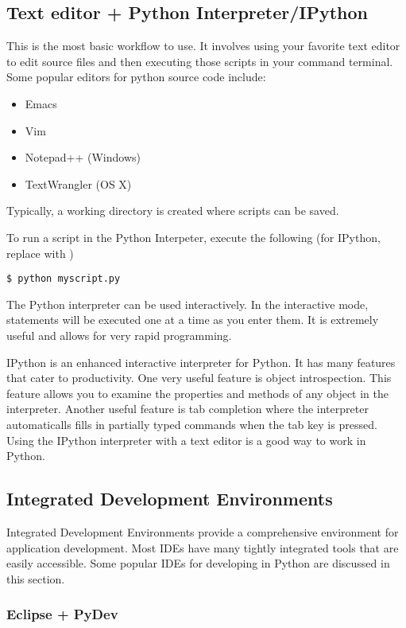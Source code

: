 \subsection*{Text editor + Python Interpreter/IPython}
This is the most basic workflow to use.
It involves using your favorite text editor to edit source files and then executing
those scripts in your command terminal.
Some popular editors for python source code include:
\begin{itemize}
\item Emacs
\item Vim
\item Notepad++ (Windows)
\item TextWrangler (OS X)
\end{itemize}
Typically, a working directory is created where scripts can be saved.

To run a script in the Python Interpeter, execute the following (for IPython, replace
 with )
\begin{verbatim}
$ python myscript.py
\end{verbatim}
The Python interpreter can be used interactively.
In the interactive mode, statements will be executed one at a time as you enter them.
It is extremely useful and allows for very rapid programming.

IPython is an enhanced interactive interpreter for Python.
It has many features that cater to productivity.
One very useful feature is object introspection.
This feature allows you to examine the properties and methods of any object in the
interpreter.
Another useful feature is tab completion where the interpreter automaticalls fills in partially typed commands when the tab key is pressed.
Using the IPython interpreter with a text editor is a good way to work in Python.

\subsection*{Integrated Development Environments}
Integrated Development Environments provide a comprehensive environment for
application development.
Most IDEs have many tightly integrated tools that are easily accessible.
Some popular IDEs for developing in Python are discussed in this section.

\subsubsection*{Eclipse + PyDev}

